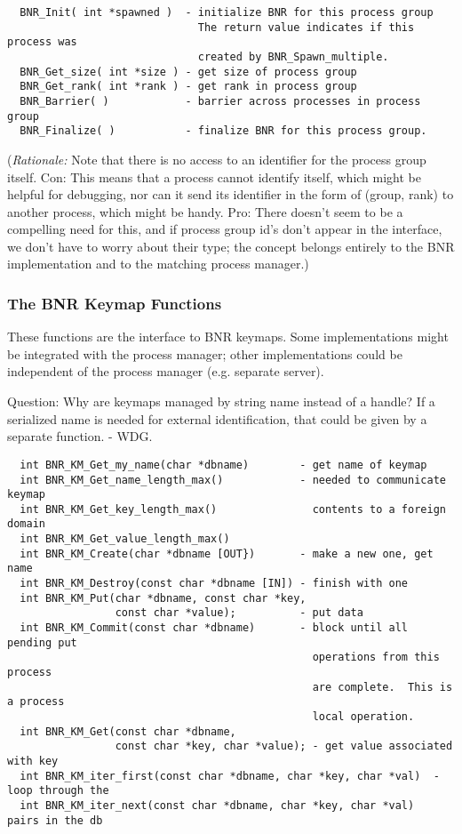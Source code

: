 \documentclass{article}
\begin{document}
\begin{verbatim}
  BNR_Init( int *spawned )  - initialize BNR for this process group
                              The return value indicates if this process was
                              created by BNR_Spawn_multiple.
  BNR_Get_size( int *size ) - get size of process group
  BNR_Get_rank( int *rank ) - get rank in process group
  BNR_Barrier( )            - barrier across processes in process group
  BNR_Finalize( )           - finalize BNR for this process group.
\end{verbatim}

({\em Rationale:\/}  Note that there is no access to an identifier for the
process group itself.  Con:  This means that a process cannot identify itself,
which might be helpful for debugging, nor can it send its identifier in the
form of (group, rank) to another process, which might be handy.  Pro:  There
doesn't seem to be a compelling need for this, and if process group id's don't
appear in the interface, we don't have to worry about their type;  the concept
belongs entirely to the BNR implementation and to the matching process
manager.) 


\subsubsection{The BNR Keymap Functions}
\label{sec:bnr-keymap}

These functions are the interface to BNR keymaps.  Some implementations might
be integrated with the process manager; other implementations could be
independent of the process manager (e.g. separate server). 

Question: Why are keymaps managed by string name instead of a handle?
If a serialized name is needed for external identification, that could be 
given by a separate function.  - WDG.

\begin{small}
\begin{verbatim}
  int BNR_KM_Get_my_name(char *dbname)        - get name of keymap
  int BNR_KM_Get_name_length_max()            - needed to communicate keymap
  int BNR_KM_Get_key_length_max()               contents to a foreign domain
  int BNR_KM_Get_value_length_max()
  int BNR_KM_Create(char *dbname [OUT})       - make a new one, get name 
  int BNR_KM_Destroy(const char *dbname [IN]) - finish with one 
  int BNR_KM_Put(char *dbname, const char *key,
                 const char *value);          - put data
  int BNR_KM_Commit(const char *dbname)       - block until all pending put
                                                operations from this process
                                                are complete.  This is a process
                                                local operation.
  int BNR_KM_Get(const char *dbname,
                 const char *key, char *value); - get value associated with key
  int BNR_KM_iter_first(const char *dbname, char *key, char *val)  - loop through the
  int BNR_KM_iter_next(const char *dbname, char *key, char *val)      pairs in the db
\end{verbatim}
\end{small}
  
\end{document}
